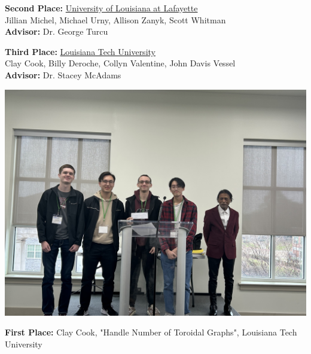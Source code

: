 \documentclass[10pt]{article} %
\begin{document}
\begin{minipage}[t]{.95\linewidth}
\begin{multicols}{2}
\begin{minipage}{\linewidth}
      \noindent\textbf{Second Place:}
      \underline{University of Louisiana at Lafayette}\\
      Jillian Michel, Michael Urny, Allison Zanyk, Scott Whitman\\
      \textbf{Advisor:} Dr. George Turcu

      \noindent\textbf{Third Place:}
      \underline{Louisiana Tech University}\\
      Clay Cook, Billy Deroche, Collyn Valentine, John Davis Vessel\\
      \textbf{Advisor:} Dr. Stacey McAdams
      
      \includegraphics[width=\linewidth]{team_comp-first_place.jpg}
      
      \BackToContents %
    \end{minipage}
  \end{multicols}

  \hypertarget{papercompetition}{} %
  \begin{adjustbox}{minipage=.5\textwidth,valign=T}
    \textbf{First Place:} Clay Cook, "Handle Number of Toroidal Graphs", Louisiana Tech University\\
    

\end{adjustbox}
\end{minipage}
\end{document}
